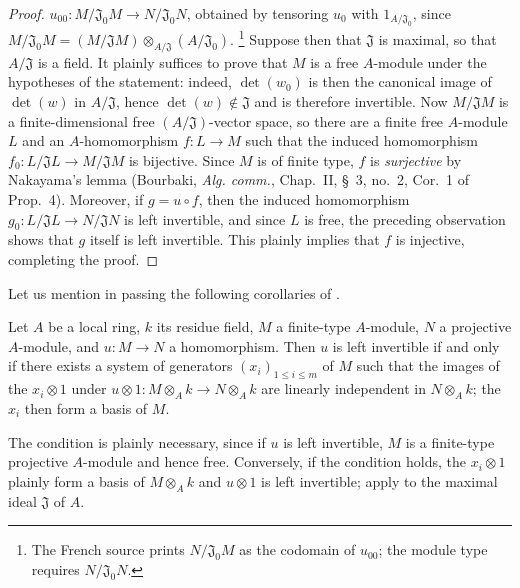 \begin{proof}
$u_{00}:M/\mathfrak J_0M\to N/\mathfrak J_0N$, obtained by tensoring $u_0$ with $1_{A/\mathfrak J_0}$, since $M/\mathfrak J_0M=(M/\mathfrak JM)\otimes_{A/\mathfrak J}(A/\mathfrak J_0)$.
\footnote{The French source prints $N/\mathfrak J_0M$ as the codomain of $u_{00}$; the module type requires $N/\mathfrak J_0N$.}
Suppose then that $\mathfrak J$ is maximal, so that $A/\mathfrak J$ is a field.
It plainly suffices to prove that $M$ is a free $A$-module under the hypotheses of the statement:
indeed, $\det(w_0)$ is then the canonical image of $\det(w)$ in $A/\mathfrak J$, hence $\det(w)\notin\mathfrak J$ and is therefore invertible.
Now $M/\mathfrak JM$ is a finite-dimensional free $(A/\mathfrak J)$-vector space, so there are a finite free $A$-module $L$ and an $A$-homomorphism $f:L\to M$ such that the induced homomorphism $f_0:L/\mathfrak JL\to M/\mathfrak JM$ is bijective.
Since $M$ is of finite type, $f$ is \emph{surjective} by Nakayama's lemma (Bourbaki, \emph{Alg. comm.}, Chap.~II, \S~3, no.~2, Cor.~1 of Prop.~4).
Moreover, if $g=u\circ f$, then the induced homomorphism $g_0:L/\mathfrak JL\to N/\mathfrak JN$ is left invertible, and since $L$ is free, the preceding observation shows that $g$ itself is left invertible.
This plainly implies that $f$ is injective, completing the proof.
\end{proof}

Let us mention in passing the following corollaries of .

\begin{corollary}[19.1.11]
\label{0.19.1.11}
Let $A$ be a local ring, $k$ its residue field, $M$ a finite-type $A$-module, $N$ a projective $A$-module, and $u:M\to N$ a homomorphism.
Then $u$ is left invertible if and only if there exists a system of generators $(x_i)_{1\leq i\leq m}$ of $M$ such that the images of the $x_i\otimes1$ under $u\otimes1:M\otimes_Ak\to N\otimes_Ak$ are linearly independent in $N\otimes_Ak$;
the $x_i$ then form a basis of $M$.
\end{corollary}

The condition is plainly necessary, since if $u$ is left invertible, $M$ is a finite-type projective $A$-module and hence free.
Conversely, if the condition holds, the $x_i\otimes1$ plainly form a basis of $M\otimes_Ak$ and $u\otimes1$ is left invertible;
apply  to the maximal ideal $\mathfrak J$ of $A$.

